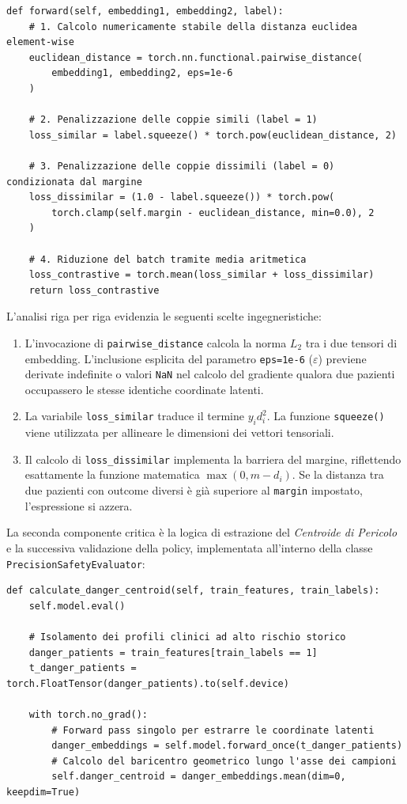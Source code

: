 \documentclass{article}
\begin{document}
\begin{verbatim}
def forward(self, embedding1, embedding2, label):
    # 1. Calcolo numericamente stabile della distanza euclidea element-wise
    euclidean_distance = torch.nn.functional.pairwise_distance(
        embedding1, embedding2, eps=1e-6
    )
    
    # 2. Penalizzazione delle coppie simili (label = 1)
    loss_similar = label.squeeze() * torch.pow(euclidean_distance, 2)
    
    # 3. Penalizzazione delle coppie dissimili (label = 0) condizionata dal margine
    loss_dissimilar = (1.0 - label.squeeze()) * torch.pow(
        torch.clamp(self.margin - euclidean_distance, min=0.0), 2
    )
    
    # 4. Riduzione del batch tramite media aritmetica
    loss_contrastive = torch.mean(loss_similar + loss_dissimilar)
    return loss_contrastive
\end{verbatim}

L'analisi riga per riga evidenzia le seguenti scelte ingegneristiche:
\begin{enumerate}
    \item L'invocazione di \texttt{pairwise\_distance} calcola la norma $L_2$ tra i due tensori di embedding. L'inclusione esplicita del parametro \texttt{eps=1e-6} ($\varepsilon$) previene derivate indefinite o valori \texttt{NaN} nel calcolo del gradiente qualora due pazienti occupassero le stesse identiche coordinate latenti.
    \item La variabile \texttt{loss\_similar} traduce il termine $y_i d_i^2$. La funzione \texttt{squeeze()} viene utilizzata per allineare le dimensioni dei vettori tensoriali.
    \item Il calcolo di \texttt{loss\_dissimilar} implementa la barriera del margine, riflettendo esattamente la funzione matematica $\max(0, m - d_i)$. Se la distanza tra due pazienti con outcome diversi è già superiore al \texttt{margin} impostato, l'espressione si azzera.
\end{enumerate}

La seconda componente critica è la logica di estrazione del \textit{Centroide di Pericolo} e la successiva validazione della policy, implementata all'interno della classe \texttt{PrecisionSafetyEvaluator}:

\begin{verbatim}
def calculate_danger_centroid(self, train_features, train_labels):
    self.model.eval()
    
    # Isolamento dei profili clinici ad alto rischio storico
    danger_patients = train_features[train_labels == 1]
    t_danger_patients = torch.FloatTensor(danger_patients).to(self.device)
    
    with torch.no_grad():
        # Forward pass singolo per estrarre le coordinate latenti
        danger_embeddings = self.model.forward_once(t_danger_patients)
        # Calcolo del baricentro geometrico lungo l'asse dei campioni
        self.danger_centroid = danger_embeddings.mean(dim=0, keepdim=True)
\end{verbatim}
\end{document}
